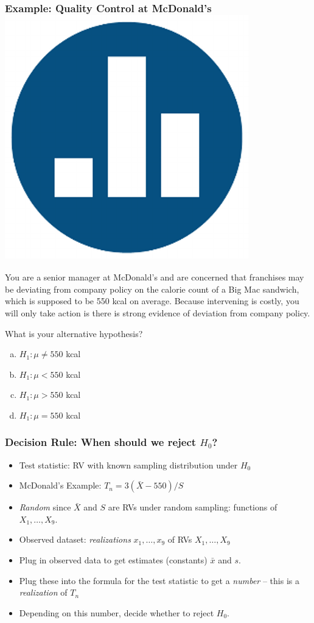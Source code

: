 \begin{frame}
\frametitle{Example: Quality Control at McDonald's \hfill \includegraphics[scale = 0.05]{./images/clicker}}

You are a senior manager at McDonald's and are concerned that franchises may be deviating from company policy on the calorie count of a Big Mac sandwich, which is supposed to be 550 kcal on average. Because intervening is costly, you will only take action is there is strong evidence of deviation from company policy. \\

\vspace{1em}

\alert{What is your alternative hypothesis?}
	\begin{enumerate}[(a)]
		\item $H_1\colon \mu \neq 550$ kcal
		\item $H_1\colon \mu < 550$ kcal
		\item $H_1\colon \mu > 550$ kcal
		\item $H_1\colon \mu = 550$ kcal
\end{enumerate}
\end{frame}
\begin{frame}
	\frametitle{Decision Rule: When should we reject $H_0$?}
	\begin{itemize}
		\item Test statistic: RV with known sampling distribution under $H_0$
		\item McDonald's Example: $T_n = 3(\bar{X} - 550)/S$
		\item \emph{Random} since $\bar{X}$ and $S$ are RVs under random sampling: functions of $X_1, \hdots, X_9$.
		\item Observed dataset: \emph{realizations} $x_1, \hdots, x_9$ of RVs $X_1, \hdots, X_9$
		\item Plug in observed data to get estimates (constants) $\bar{x}$ and $s$.
		\item Plug these into the formula for the test statistic to get a \emph{number} -- this is a \emph{realization} of $T_n$ 
		\item Depending on this number, decide whether to reject $H_0$.
	\end{itemize}
\end{frame}
